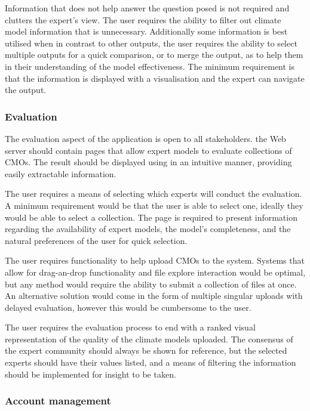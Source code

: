\documentclass{ecmm427_assignment}
\begin{document}
 Information that does not help answer the question posed is not required and clutters the expert's view. The user requires the ability to filter out climate model information that is unnecessary. Additionally some information is best utilised when in contrast to other outputs, the user requires the ability to select multiple outputs for a quick comparison, or to merge the output, as to help them in their understanding of the model effectiveness. The minimum requirement is that the information is displayed with a visualisation and the expert can navigate the output. 

\subsubsection{Evaluation}

 The evaluation aspect of the application is open to all stakeholders. the Web server should contain pages that allow expert models to evaluate collections of CMOs. The result should be displayed using in an intuitive manner, providing easily extractable information.

 The user requires a means of selecting which experts will conduct the evaluation. A minimum requirement would be that the user is able to select one, ideally they would be able to select a collection. The page is required to present information regarding the availability of expert models, the model's completeness, and the natural preferences of the user for quick selection.

 The user requires functionality to help upload CMOs to the system. Systems that allow for drag-an-drop functionality and file explore interaction would be optimal, but any method would require the ability to submit a collection of files at once. An alternative solution would come in the form of multiple singular uploads with delayed evaluation, however this would be cumbersome to the user.

 The user requires the evaluation process to end with a ranked visual representation of the quality of the climate models uploaded. The consensus of the expert community should always be shown for reference, but the selected experts should have their values listed, and a means of filtering the information should be implemented for insight to be taken.

\subsubsection{Account management}
\end{document}
